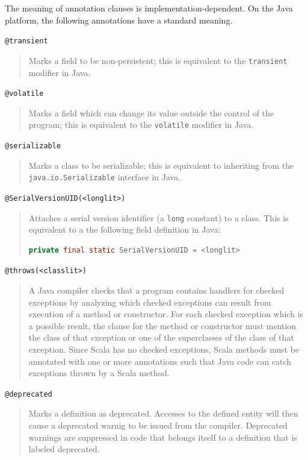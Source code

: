 {The meaning of annotation clauses is implementation-dependent. On the
Java platform, the following annotations have a standard meaning.\bigskip

\lstinline^@transient^
\begin{quote}
Marks a field to be non-persistent; this is
equivalent to the \lstinline^transient^
modifier in Java.
\end{quote}

\lstinline^@volatile^
\begin{quote}Marks a field which can change its value
outside the control of the program; this
is equivalent to the \lstinline^volatile^
modifier in Java.
\end{quote}

\lstinline^@serializable^
\begin{quote}Marks a class to be serializable; this is
equivalent to inheriting from the 
\lstinline^java.io.Serializable^ interface
in Java.
\end{quote}

\lstinline^@SerialVersionUID(<longlit>)^
\begin{quote}Attaches a serial version identifier (a
\lstinline^long^ constant) to a class.
This is equivalent to a the following field
definition in Java:
\begin{lstlisting}[language=Java]
  private final static SerialVersionUID = <longlit> 
\end{lstlisting}
\end{quote}

\lstinline^@throws(<classlit>)^
\begin{quote}
A Java compiler checks that a program contains handlers for checked exceptions
by analyzing which checked exceptions can result from execution of a method or
constructor. For each checked exception which is a possible result, the 
clause for the method or constructor must mention the class of that exception
or one of the superclasses of the class of that exception. Since Scala has no
checked exceptions, Scala methods must be annotated with one or more 
annotations such that Java code can catch exceptions thrown by a Scala method.
\end{quote}

\lstinline^@deprecated^
\begin{quote} Marks a definition as deprecated. Accesses to the
  defined entity will then cause a
  deprecated warnig to be issued from the compiler.  Deprecated
  warnings are suppressed in code that belongs itself to a definition
  that is labeled deprecated.
\end{quote}

}
